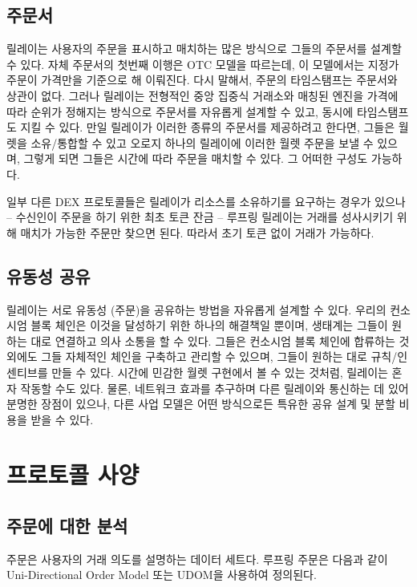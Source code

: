 \documentclass{article}
\begin{document}
\begin{multicols}{2}
\subsection{주문서\label{sec:order_book}}
릴레이는 사용자의 주문을 표시하고 매치하는 많은 방식으로 그들의 주문서를 설계할 수 있다. 자체 주문서의 첫번째 이행은 OTC 모델을 따르는데, 이 모델에서는 지정가 주문이 가격만을 기준으로 해 이뤄진다. 다시 말해서, 주문의 타임스탬프는 주문서와 상관이 없다. 그러나 릴레이는 전형적인 중앙 집중식 거래소와 매칭된 엔진을 가격에 따라 순위가 정해지는 방식으로 주문서를 자유롭게 설계할 수 있고, 동시에 타임스탬프도 지킬 수 있다. 만일 릴레이가 이러한 종류의 주문서를 제공하려고 한다면, 그들은 월렛을 소유/통합할 수 있고 오로지 하나의 릴레이에 이러한 월렛 주문을 보낼 수 있으며, 그렇게 되면 그들은 시간에 따라 주문을 매치할 수 있다. 그 어떠한 구성도 가능하다.

일부 다른 DEX 프로토콜들은 릴레이가 리소스를 소유하기를 요구하는 경우가 있으나 – 수신인이 주문을 하기 위한 최초 토큰 잔금 – 루프링 릴레이는 거래를 성사시키기 위해 매치가 가능한 주문만 찾으면 된다. 따라서 초기 토큰 없이 거래가 가능하다.

\subsection{유동성 공유\label{sec:liquidity_sharing}}
릴레이는 서로 유동성 (주문)을 공유하는 방법을 자유롭게 설계할 수 있다. 우리의 컨소시엄 블록 체인은 이것을 달성하기 위한 하나의 해결책일 뿐이며, 생태계는 그들이 원하는 대로 연결하고 의사 소통을 할 수 있다. 그들은 컨소시엄 블록 체인에 합류하는 것 외에도 그들 자체적인 체인을 구축하고 관리할 수 있으며, 그들이 원하는 대로 규칙/인센티브를 만들 수 있다. 시간에 민감한 월렛 구현에서 볼 수 있는 것처럼, 릴레이는 혼자 작동할 수도 있다. 물론, 네트워크 효과를 추구하며 다른 릴레이와 통신하는 데 있어 분명한 장점이 있으나, 다른 사업 모델은 어떤 방식으로든 특유한 공유 설계 및 분할 비용을 받을 수 있다.



\section{프로토콜 사양\label{sec:protocol}}

\subsection{주문에 대한 분석\label{anatomy}}

주문은 사용자의 거래 의도를 설명하는 데이터 세트다. 루프링 주문은 다음과 같이 Uni-Directional Order Model 또는 UDOM을 사용하여 정의된다.


\end{multicols}
\end{document}
